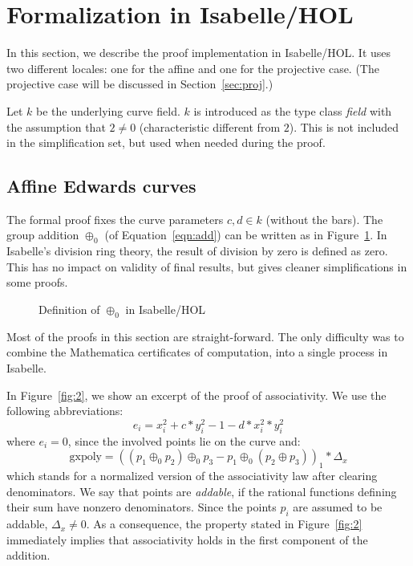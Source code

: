 \documentclass{llncs}
\begin{document}
\section{Formalization in Isabelle/HOL}

In this section, we describe the proof implementation in Isabelle/HOL. It
uses two different locales: one for the affine and one for the
projective case. (The projective case will be discussed in Section~\ref{sec:proj}.)

Let $k$ be the underlying curve field. $k$ is introduced as the type
class \textit{field} with the assumption that $2 \neq 0$
(characteristic different from $2$). This is not included in the
simplification set, but used when needed during the proof.


\subsection{Affine Edwards curves}

The formal proof fixes the curve parameters $c,d \in k$ (without the bars). The group
addition $\oplus_0$ (of Equation~\ref{eqn:add})
can be written as in Figure~\ref{fig:1}. 
In Isabelle's division ring theory, the result of division by zero is
defined as zero. This has no impact on validity of final results, but gives cleaner
simplifications in some proofs.

\begin{figure}
	{}
	\caption{Definition of $\oplus_0$ in Isabelle/HOL}
	\label{fig:1}
\end{figure}

Most of the proofs in this section are straight-forward. The only
difficulty was to combine the Mathematica certificates of computation, 
into a single process in Isabelle.

In Figure~\ref{fig:2}, we show an excerpt of the proof of
associativity. We use the following abbreviations: 
\[
e_i = x_i^2 + c *
y_i^2 - 1 - d * x_i^2 * y_i^2 
\] 
where $e_i = 0$, since the involved
points lie on the curve and: 
\[
\text{gxpoly} = ((p_1 \oplus_0 p_2)
\oplus_0 p_3 - p_1 \oplus_0 (p_2 \oplus p_3))_1*\Delta_x
\] 
which stands for a normalized version of the associativity law
after clearing denominators. We say that points are \emph{addable}, if the
rational functions defining their sum have nonzero denominators.
Since the points $p_i$ are assumed to be
addable, $\Delta_x \neq 0$. As a consequence, the property stated in
Figure~\ref{fig:2} immediately implies that associativity holds in the
first component of the addition.
\end{document}
